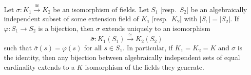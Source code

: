 Let $\sigma \colon K_1 \xrightarrow{\cong} K_2$ be an isomorphism of fields.
Let $S_1$ [resp.\ $S_2$] be an algebraically independent subset of some extension field of $K_1$ [resp.\ $K_2$] with $|S_1| = |S_2|$.
If $\varphi \colon S_1 \to S_2$ is a bijection, then $\sigma$ extends uniquely to an isomorphism
\[
\bar{\sigma} \colon K_1(S_1) \xrightarrow{\cong} K_2(S_2)
\]
such that $\bar{\sigma}(s) = \varphi(s)$ for all $s \in S_1$.
In particular, if $K_1 = K_2 = K$ and $\sigma$ is the identity, then any bijection between algebraically independent sets of equal cardinality extends to a $K$-isomorphism of the fields they generate.
